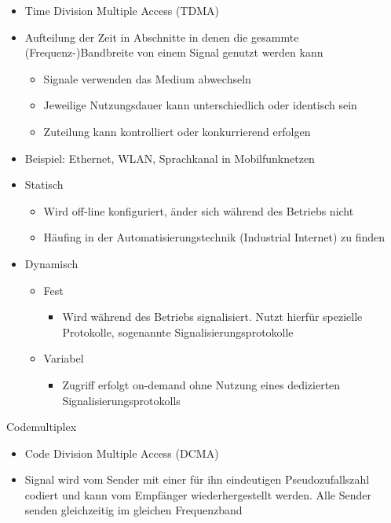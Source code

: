     \begin{itemize}
      \item Time Division Multiple Access (TDMA)
      \item Aufteilung der Zeit in Abschnitte in denen die gesammte (Frequenz-)Bandbreite von einem
        Signal genutzt werden kann
        \begin{itemize}
          \item Signale verwenden das Medium abwechseln
          \item Jeweilige Nutzungsdauer kann unterschiedlich oder identisch sein
          \item Zuteilung kann kontrolliert oder konkurrierend erfolgen
        \end{itemize}
      \item Beispiel: Ethernet, WLAN, Sprachkanal in Mobilfunknetzen
      \item Statisch
        \begin{itemize}
          \item Wird off-line konfiguriert, änder sich während des Betriebs nicht
          \item Häufing in der Automatisierungstechnik (Industrial Internet) zu finden
        \end{itemize}
      \item Dynamisch
        \begin{itemize}
          \item Fest
            \begin{itemize}
              \item Wird während des Betriebs signalisiert. Nutzt hierfür spezielle Protokolle,
                sogenannte Signalisierungsprotokolle
            \end{itemize}
          \item Variabel
            \begin{itemize}
              \item Zugriff erfolgt on-demand ohne Nutzung eines dedizierten Signalisierungsprotokolls
            \end{itemize}
        \end{itemize}
    \end{itemize}
    Codemultiplex
    \begin{itemize}
      \item Code Division Multiple Access (DCMA)
      \item Signal wird vom Sender mit einer für ihn eindeutigen Pseudozufallszahl codiert und kann
        vom Empfänger wiederhergestellt werden. Alle Sender senden gleichzeitig im gleichen
        Frequenzband
    \end{itemize}
